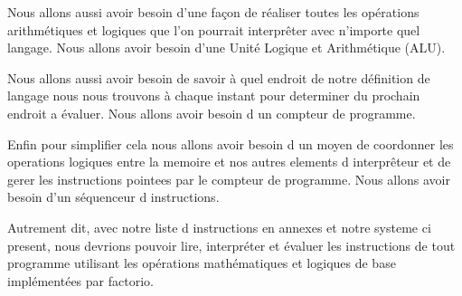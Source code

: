 Nous allons aussi avoir besoin d'une façon de réaliser toutes les opérations arithmétiques et logiques que l'on pourrait interprêter avec n'importe quel langage. Nous allons avoir besoin d'une Unité Logique et Arithmétique (ALU).

Nous allons aussi avoir besoin de savoir à quel endroit de notre définition de langage nous nous trouvons à chaque instant pour determiner du prochain endroit a évaluer. Nous allons avoir besoin d un compteur de programme.

Enfin pour simplifier cela nous allons avoir besoin d un moyen de coordonner les operations logiques entre la memoire et nos autres elements d interprêteur et de gerer les instructions pointees par le compteur de programme. Nous allons avoir besoin d'un séquenceur d instructions.

Autrement dit, avec notre liste d instructions en annexes et notre systeme ci present, nous devrions pouvoir lire, interpréter et évaluer les instructions de tout programme utilisant les opérations mathématiques et logiques de base implémentées par factorio. 